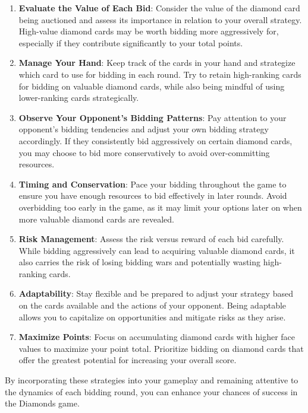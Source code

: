 \documentclass{article}
\begin{document}
\begin{enumerate}
    \item \textbf{Evaluate the Value of Each Bid}: Consider the value of the diamond card being auctioned and assess its importance in relation to your overall strategy. High-value diamond cards may be worth bidding more aggressively for, especially if they contribute significantly to your total points.
    
    \item \textbf{Manage Your Hand}: Keep track of the cards in your hand and strategize which card to use for bidding in each round. Try to retain high-ranking cards for bidding on valuable diamond cards, while also being mindful of using lower-ranking cards strategically.
    
    \item \textbf{Observe Your Opponent's Bidding Patterns}: Pay attention to your opponent's bidding tendencies and adjust your own bidding strategy accordingly. If they consistently bid aggressively on certain diamond cards, you may choose to bid more conservatively to avoid over-committing resources.
    
    \item \textbf{Timing and Conservation}: Pace your bidding throughout the game to ensure you have enough resources to bid effectively in later rounds. Avoid overbidding too early in the game, as it may limit your options later on when more valuable diamond cards are revealed.
    
    \item \textbf{Risk Management}: Assess the risk versus reward of each bid carefully. While bidding aggressively can lead to acquiring valuable diamond cards, it also carries the risk of losing bidding wars and potentially wasting high-ranking cards.
    
    \item \textbf{Adaptability}: Stay flexible and be prepared to adjust your strategy based on the cards available and the actions of your opponent. Being adaptable allows you to capitalize on opportunities and mitigate risks as they arise.
    
    \item \textbf{Maximize Points}: Focus on accumulating diamond cards with higher face values to maximize your point total. Prioritize bidding on diamond cards that offer the greatest potential for increasing your overall score.
\end{enumerate}

By incorporating these strategies into your gameplay and remaining attentive to the dynamics of each bidding round, you can enhance your chances of success in the Diamonds game.
\end{document}
